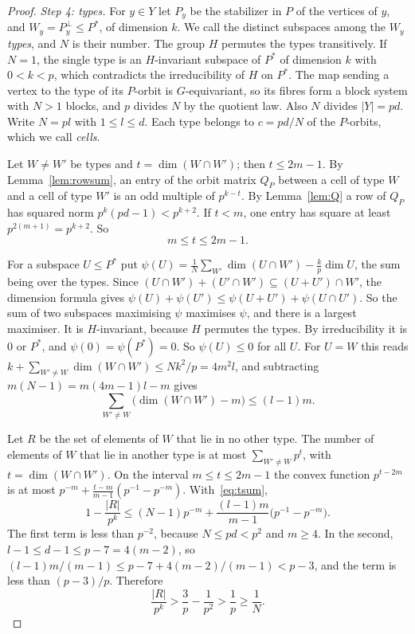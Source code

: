 \documentclass[11pt]{amsart}
\theoremstyle{definition}
\theoremstyle{remark}
\begin{document}
\begin{proof}
\emph{Step 4: types.} For $y\in Y$ let $P_y$ be the stabilizer in $P$ of the vertices of $y$, and $W_y=P_y^\perp\le P^*$, of dimension $k$. We call the distinct subspaces among the $W_y$ \emph{types}, and $N$ is their number. The group $H$ permutes the types transitively. If $N=1$, the single type is an $H$-invariant subspace of $P^*$ of dimension $k$ with $0<k<p$, which contradicts the irreducibility of $H$ on $P^*$. The map sending a vertex to the type of its $P$-orbit is $G$-equivariant, so its fibres form a block system with $N>1$ blocks, and $p$ divides $N$ by the quotient law. Also $N$ divides $|Y|=pd$. Write $N=pl$ with $1\le l\le d$. Each type belongs to $c=pd/N$ of the $P$-orbits, which we call \emph{cells}.

Let $W\ne W'$ be types and $t=\dim(W\cap W')$; then $t\le2m-1$. By Lemma~\ref{lem:rowsum}, an entry of the orbit matrix $Q_P$ between a cell of type $W$ and a cell of type $W'$ is an odd multiple of $p^{k-t}$. By Lemma~\ref{lem:Q} a row of $Q_P$ has squared norm $p^k(pd-1)<p^{k+2}$. If $t<m$, one entry has square at least $p^{2(m+1)}=p^{k+2}$. So
\[
m\le t\le2m-1 .
\]

For a subspace $U\le P^*$ put $\psi(U)=\frac1N\sum_{W'}\dim(U\cap W')-\frac kp\dim U$, the sum being over the types. Since $(U\cap W')+(U'\cap W')\subseteq(U+U')\cap W'$, the dimension formula gives $\psi(U)+\psi(U')\le\psi(U+U')+\psi(U\cap U')$. So the sum of two subspaces maximising $\psi$ maximises $\psi$, and there is a largest maximiser. It is $H$-invariant, because $H$ permutes the types. By irreducibility it is $0$ or $P^*$, and $\psi(0)=\psi(P^*)=0$. So $\psi(U)\le0$ for all $U$. For $U=W$ this reads $k+\sum_{W'\ne W}\dim(W\cap W')\le Nk^2/p=4m^2l$, and subtracting $m(N-1)=m(4m-1)l-m$ gives
\begin{equation}\label{eq:tsum}
\sum_{W'\ne W}\bigl(\dim(W\cap W')-m\bigr)\le(l-1)m .
\end{equation}

Let $R$ be the set of elements of $W$ that lie in no other type. The number of elements of $W$ that lie in another type is at most $\sum_{W'\ne W}p^{t}$, with $t=\dim(W\cap W')$. On the interval $m\le t\le2m-1$ the convex function $p^{t-2m}$ is at most $p^{-m}+\frac{t-m}{m-1}(p^{-1}-p^{-m})$. With~\eqref{eq:tsum},
\[
1-\frac{|R|}{p^k}\le(N-1)p^{-m}+\frac{(l-1)m}{m-1}\bigl(p^{-1}-p^{-m}\bigr).
\]
The first term is less than $p^{-2}$, because $N\le pd<p^2$ and $m\ge4$. In the second, $l-1\le d-1\le p-7=4(m-2)$, so $(l-1)m/(m-1)\le p-7+4(m-2)/(m-1)<p-3$, and the term is less than $(p-3)/p$. Therefore
\begin{equation}\label{eq:private}
\frac{|R|}{p^k}>\frac3p-\frac1{p^2}>\frac1p\ge\frac1N .
\end{equation}


\end{proof}
\end{document}
